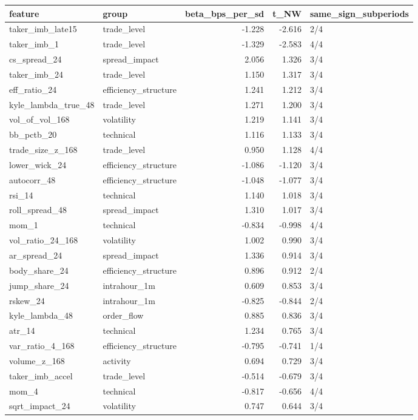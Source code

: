 \begin{tabular}{llrrl}
\toprule
feature & group & beta_bps_per_sd & t_NW & same_sign_subperiods \\
\midrule
taker_imb_late15 & trade_level & -1.228 & -2.616 & 2/4 \\
taker_imb_1 & trade_level & -1.329 & -2.583 & 4/4 \\
cs_spread_24 & spread_impact & 2.056 & 1.326 & 3/4 \\
taker_imb_24 & trade_level & 1.150 & 1.317 & 3/4 \\
eff_ratio_24 & efficiency_structure & 1.241 & 1.212 & 3/4 \\
kyle_lambda_true_48 & trade_level & 1.271 & 1.200 & 3/4 \\
vol_of_vol_168 & volatility & 1.219 & 1.141 & 3/4 \\
bb_pctb_20 & technical & 1.116 & 1.133 & 3/4 \\
trade_size_z_168 & trade_level & 0.950 & 1.128 & 4/4 \\
lower_wick_24 & efficiency_structure & -1.086 & -1.120 & 3/4 \\
autocorr_48 & efficiency_structure & -1.048 & -1.077 & 3/4 \\
rsi_14 & technical & 1.140 & 1.018 & 3/4 \\
roll_spread_48 & spread_impact & 1.310 & 1.017 & 3/4 \\
mom_1 & technical & -0.834 & -0.998 & 4/4 \\
vol_ratio_24_168 & volatility & 1.002 & 0.990 & 3/4 \\
ar_spread_24 & spread_impact & 1.336 & 0.914 & 3/4 \\
body_share_24 & efficiency_structure & 0.896 & 0.912 & 2/4 \\
jump_share_24 & intrahour_1m & 0.609 & 0.853 & 3/4 \\
rskew_24 & intrahour_1m & -0.825 & -0.844 & 2/4 \\
kyle_lambda_48 & order_flow & 0.885 & 0.836 & 3/4 \\
atr_14 & technical & 1.234 & 0.765 & 3/4 \\
var_ratio_4_168 & efficiency_structure & -0.795 & -0.741 & 1/4 \\
volume_z_168 & activity & 0.694 & 0.729 & 3/4 \\
taker_imb_accel & trade_level & -0.514 & -0.679 & 3/4 \\
mom_4 & technical & -0.817 & -0.656 & 4/4 \\
sqrt_impact_24 & volatility & 0.747 & 0.644 & 3/4 \\

\end{tabular}
